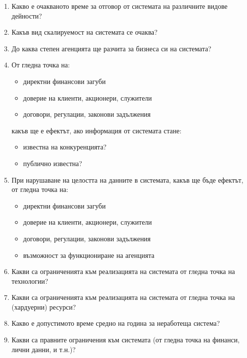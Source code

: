 \documentclass[]{article}
\begin{document}
\begin{enumerate}[I.]
{\begin{enumerate}[1.]
			\item Какво е очакваното време за отговор от системата на различните видове дейности?
			\item Какъв вид скалируемост на системата се очаква?
			\item До каква степен агенцията ще разчита за бизнеса си на системата?
			\item {От гледна точка на:
				\begin{itemize}
					\item директни финансови загуби
					\item доверие на клиенти, акционери, служители
					\item договори, регулации, законови задължения
   				\end{itemize}
        какъв ще е ефектът, ако информация от системата стане:
				\begin{itemize}
					\item известна на конкуренцията?
					\item публично известна?
   				\end{itemize}
        	}
			\item {При нарушаване на целостта на данните в системата, какъв ще бъде ефектът, от гледна точка на:
				\begin{itemize}
					\item директни финансови загуби
					\item доверие на клиенти, акционери, служители
					\item договори, регулации, законови задължения
					\item възможност за функциониране на агенцията
   				\end{itemize}
			}
			\item Какви са ограниченията към реализацията на системата от гледна точка на технологии?
			\item Какви са ограниченията към реализацията на системата от гледна точка на (хардуерни) ресурси?
			\item Какво е допустимото време средно на година за неработеща система?
			\item Какви са правните ограничения към системата (от гледна точка на финанси, лични данни, и т.н.)?
		\end{enumerate}
	}
\end{enumerate}
\end{document}

